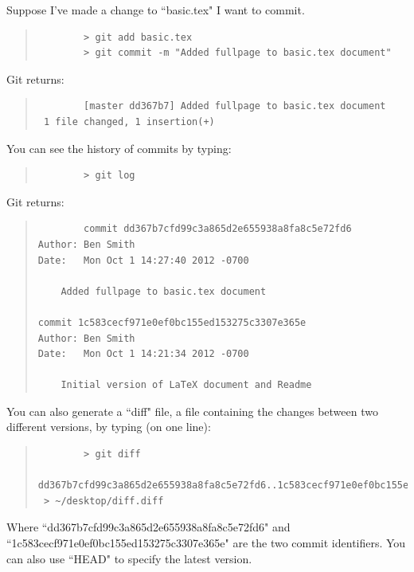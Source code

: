 Suppose I've made a change to ``basic.tex" I want to commit.

\begin{quote}
	\begin{verbatim}
		> git add basic.tex
		> git commit -m "Added fullpage to basic.tex document"
	\end{verbatim}
\end{quote}

Git returns:

\begin{quote}
	\begin{verbatim}
		[master dd367b7] Added fullpage to basic.tex document
 1 file changed, 1 insertion(+)
	\end{verbatim}
\end{quote}

You can see the history of commits by typing:

\begin{quote}
	\begin{verbatim}
		> git log
	\end{verbatim}
\end{quote}

Git returns:

\begin{quote}
	\begin{verbatim}
		commit dd367b7cfd99c3a865d2e655938a8fa8c5e72fd6
Author: Ben Smith 
Date:   Mon Oct 1 14:27:40 2012 -0700

    Added fullpage to basic.tex document

commit 1c583cecf971e0ef0bc155ed153275c3307e365e
Author: Ben Smith 
Date:   Mon Oct 1 14:21:34 2012 -0700

    Initial version of LaTeX document and Readme
	\end{verbatim}
\end{quote}

You can also generate a ``diff" file, a file containing the changes between two different versions, by typing (on one line):

\begin{quote}
	\begin{verbatim}
		> git diff 
	dd367b7cfd99c3a865d2e655938a8fa8c5e72fd6..1c583cecf971e0ef0bc155ed153275c3307e365e
 > ~/desktop/diff.diff
	\end{verbatim}
\end{quote}

Where ``dd367b7cfd99c3a865d2e655938a8fa8c5e72fd6" and ``1c583cecf971e0ef0bc155ed153275c3307e365e" are the two commit identifiers.  You can also use ``HEAD" to specify the latest version.